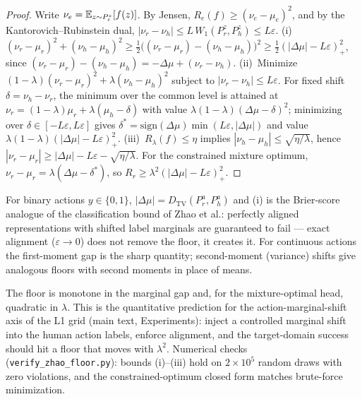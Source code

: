 \begin{proof}
Write $\nu_e = \mathbb{E}_{z \sim P_e^z}[f(z)]$.
By Jensen, $R_e(f) \ge (\nu_e - \mu_e)^2$, and by the Kantorovich--Rubinstein dual, $|\nu_r - \nu_h| \le L\, W_1(P_r^z, P_h^z) \le L\varepsilon$.
(i)~$(\nu_r-\mu_r)^2 + (\nu_h-\mu_h)^2 \ge \tfrac12\big((\nu_r-\mu_r) - (\nu_h-\mu_h)\big)^2 \ge \tfrac12(|\Delta\mu| - L\varepsilon)_+^2$, since $(\nu_r-\mu_r) - (\nu_h-\mu_h) = -\Delta\mu + (\nu_r - \nu_h)$.
(ii)~Minimize $(1-\lambda)(\nu_r-\mu_r)^2 + \lambda(\nu_h-\mu_h)^2$ subject to $|\nu_r-\nu_h| \le L\varepsilon$. For fixed shift $\delta = \nu_h - \nu_r$, the minimum over the common level is attained at $\nu_r = (1-\lambda)\mu_r + \lambda(\mu_h - \delta)$ with value $\lambda(1-\lambda)(\Delta\mu - \delta)^2$; minimizing over $\delta \in [-L\varepsilon, L\varepsilon]$ gives $\delta^* = \mathrm{sign}(\Delta\mu)\min(L\varepsilon, |\Delta\mu|)$ and value $\lambda(1-\lambda)(|\Delta\mu| - L\varepsilon)_+^2$.
(iii)~$R_\lambda(f) \le \eta$ implies $|\nu_h - \mu_h| \le \sqrt{\eta/\lambda}$, hence $|\nu_r - \mu_r| \ge |\Delta\mu| - L\varepsilon - \sqrt{\eta/\lambda}$.
For the constrained mixture optimum, $\nu_r - \mu_r = \lambda(\Delta\mu - \delta^*)$, so $R_r \ge \lambda^2(|\Delta\mu| - L\varepsilon)_+^2$.
\end{proof}

\begin{remark}
For binary actions $y \in \{0,1\}$, $|\Delta\mu| = D_{\mathrm{TV}}(P_r^a, P_h^a)$ and (i) is the Brier-score analogue of the classification bound of Zhao et al.: perfectly aligned representations with shifted label marginals are guaranteed to fail --- exact alignment ($\varepsilon \to 0$) does not remove the floor, it creates it.
For continuous actions the first-moment gap is the sharp quantity; second-moment (variance) shifts give analogous floors with second moments in place of means.
\end{remark}

\begin{remark}
The floor is monotone in the marginal gap and, for the mixture-optimal head, quadratic in $\lambda$.
This is the quantitative prediction for the action-marginal-shift axis of the L1 grid (main text, Experiments): inject a controlled marginal shift into the human action labels, enforce alignment, and the target-domain success should hit a floor that moves with $\lambda^2$.
Numerical checks (\texttt{verify\_zhao\_floor.py}): bounds (i)--(iii) hold on $2\times10^5$ random draws with zero violations, and the constrained-optimum closed form matches brute-force minimization.
\end{remark}

